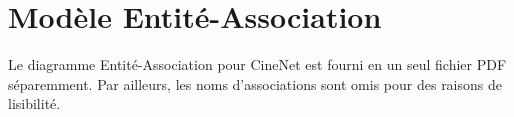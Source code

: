 \section{Modèle Entité-Association}

Le diagramme Entité-Association pour CineNet est fourni en un seul fichier PDF séparemment. Par ailleurs, 
les noms d'associations sont omis pour des raisons de lisibilité.